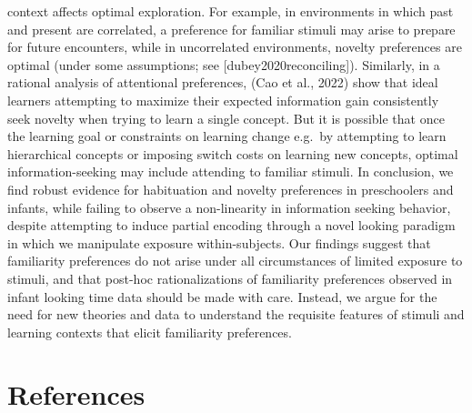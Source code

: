 \documentclass[10pt, letterpaper]{article}
\begin{document}
context affects optimal exploration. For example, in environments in
which past and present are correlated, a preference for familiar stimuli
may arise to prepare for future encounters, while in uncorrelated
environments, novelty preferences are optimal (under some assumptions;
see {[}dubey2020reconciling{]}). Similarly, in a rational analysis of
attentional preferences, (Cao et al., 2022) show that ideal learners
attempting to maximize their expected information gain consistently seek
novelty when trying to learn a single concept. But it is possible that
once the learning goal or constraints on learning change e.g.~by
attempting to learn hierarchical concepts or imposing switch costs on
learning new concepts, optimal information-seeking may include attending
to familiar stimuli. In conclusion, we find robust evidence for
habituation and novelty preferences in preschoolers and infants, while
failing to observe a non-linearity in information seeking behavior,
despite attempting to induce partial encoding through a novel looking
paradigm in which we manipulate exposure within-subjects. Our findings
suggest that familiarity preferences do not arise under all
circumstances of limited exposure to stimuli, and that post-hoc
rationalizations of familiarity preferences observed in infant looking
time data should be made with care. Instead, we argue for the need for
new theories and data to understand the requisite features of stimuli
and learning contexts that elicit familiarity preferences.

\hypertarget{references}{%
\section{References}\label{references}}

\setlength{\parindent}{-0.1in} 
\setlength{\leftskip}{0.125in}

\noindent
\end{document}
